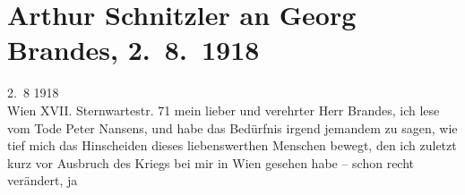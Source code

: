 

         
         \renewcommand{\erwaehntePersonen}{Personen: Georg Brandes, Gaius Iulius Caesar, Johann Wolfgang von Goethe, Peter Nansen, Heinrich Schnitzler, Lili Schnitzler, Olga Schnitzler, Elisabeth Steinrück,  Voltaire}
         \renewcommand{\erwaehnteOrte}{Orte: Bayern, Dänemark, Garmisch-Partenkirchen, Kopenhagen, Sternwartestraße, Wien, Österreich}
         \renewcommand{\erwaehnteWerke}{Werke: Casanovas Heimfahrt, Die Schwestern oder Casanova in Spa. Lustspiel in Versen, Gaius Julius Cæsar, Voltaire und sein Jahrhundert, Wolfgang Goethe}
               \section[Arthur Schnitzler an Georg Brandes, 2. 8. 1918]{ Arthur Schnitzler an Georg Brandes, 2. 8. 1918}\nopagebreak{}\rehead{ }\begin{ledgroupsized}[t]{13cm}\normalsize\beginnumbering \toendnotes[C]{\smallbreak\pagebreak[2]} 
\toendnotes[C]{\smallbreak}\pstart
           \raggedleft{}{\pb}2. 8 1918{\\}Wien XVII. Sternwartestr. 71\pend
           \pstart{}mein lieber und verehrter Herr Brandes,\pend\pstart
           ich lese vom Tode Peter Nansens, und habe das
               Bedürfnis irgend jemandem zu sagen, wie tief mich das Hinscheiden dieses
               liebenswerthen Menschen bewegt, den ich zuletzt kurz vor Ausbruch des Kriegs bei mir
               in Wien gesehen habe – schon recht verändert, ja

\end{ledgroupsized}
